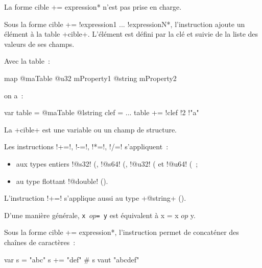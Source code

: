 
La forme \ggsq*cible += expression* n'est pas prise en charge.

Sous la forme \ggsq*cible += !expression1 ... !expressionN*, l'instruction ajoute un élément à la table \ggsq+cible+. L'élément est défini par la clé et suivie de la liste des valeurs de ses champs.


Avec la table~:
\begin{galgas4}
map @maTable {
  @u32 mProperty1
  @string mProperty2
}
\end{galgas4}

on a~:

\begin{galgas4}
var table = @maTable {}
@lstring clef = ...
table += !clef !2 !"a"
\end{galgas4}















La \ggsq+cible+ est une variable ou un champ de structure.

Les instructions \ggsq!+=!, \ggsq!-=!, \ggsq!*=!, \ggsq!/=! s'appliquent~:
\begin{itemize}
 \item aux types entiers \ggsq!@s32! (, \ggsq!@s64! (, \ggsq!@u32! ( et \ggsq!@u64! (~;
 \item au type flottant \ggsq!@double! ().
\end{itemize}

L'instruction \ggsq!+=! s'applique aussi au type \ggsq+@string+ ().

D'une manière générale, \texttt{x $op$= y} est équivalent à {x = x $op$ y}.



Sous la forme \ggsq*cible += expression*, l'instruction permet de concaténer des chaînes de caractères~:
\begin{galgas4}
var s = "abc"
s += "def" # s vaut "abcdef"
\end{galgas4}

















